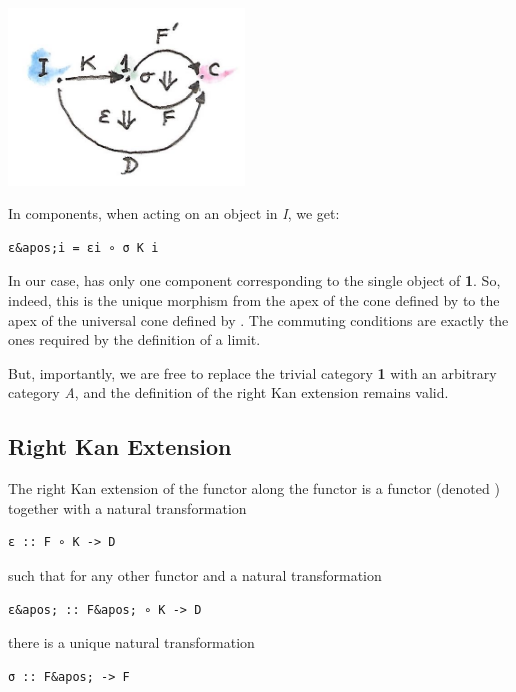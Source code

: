 \includegraphics[width=2.46875in]{images/kan5.jpg}

In components, when acting on an object  in \emph{I}, we get:

\begin{verbatim}
ε&apos;i = εi ∘ σ K i
\end{verbatim}

In our case,  has only one component corresponding to the
single object of \textbf{1}. So, indeed, this is the unique morphism
from the apex of the cone defined by  to the apex of
the universal cone defined by . The commuting conditions
are exactly the ones required by the definition of a limit.

But, importantly, we are free to replace the trivial category \textbf{1}
with an arbitrary category \emph{A}, and the definition of the right Kan
extension remains valid.

\subsection{Right Kan Extension}\label{right-kan-extension}

The right Kan extension of the functor 
along the functor  is a functor
 (denoted ) together with a
natural transformation

\begin{verbatim}
ε :: F ∘ K -> D
\end{verbatim}

such that for any other functor  and
a natural transformation

\begin{verbatim}
ε&apos; :: F&apos; ∘ K -> D
\end{verbatim}

there is a unique natural transformation

\begin{verbatim}
σ :: F&apos; -> F
\end{verbatim}

